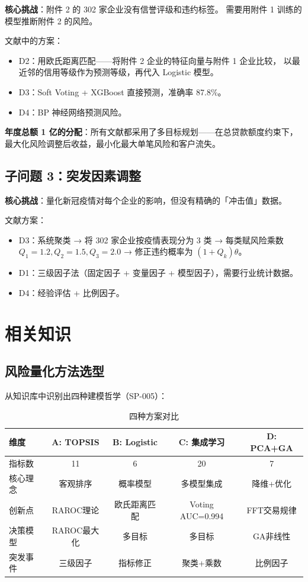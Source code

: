 \documentclass{internal-report}
\begin{document}
\textbf{核心挑战}：附件 2 的 302 家企业没有信誉评级和违约标签。
需要用附件 1 训练的模型推断附件 2 的风险。

文献中的方案：
\begin{itemize}
  \item D2：用欧氏距离匹配——将附件 2 企业的特征向量与附件 1 企业比较，
    以最近邻的信用等级作为预测等级，再代入 Logistic 模型。
  \item D3：Soft Voting + XGBoost 直接预测，准确率 87.8\%。
  \item D4：BP 神经网络预测风险。
\end{itemize}

\textbf{年度总额 1 亿的分配}：所有文献都采用了多目标规划——在总贷款额度约束下，
最大化风险调整后收益，最小化最大单笔风险和客户流失。

\subsection{子问题 3：突发因素调整}

\textbf{核心挑战}：量化新冠疫情对每个企业的影响，但没有精确的「冲击值」数据。

文献方案：
\begin{itemize}
  \item D3：系统聚类 → 将 302 家企业按疫情表现分为 3 类 → 每类赋风险乘数
    $Q_1=1.2, Q_2=1.5, Q_3=2.0$ → 修正违约概率为 $(1+Q_k)\theta$。
  \item D1：三级因子法（固定因子 + 变量因子 + 模型因子），需要行业统计数据。
  \item D4：经验评估 + 比例因子。
\end{itemize}

\section{相关知识}

\subsection{风险量化方法选型}

从知识库中识别出四种建模哲学（SP-005）：

\begin{table}[h]
\centering
\caption{四种方案对比}
\begin{tabular}{lcccc}
\toprule
维度 & A: TOPSIS & B: Logistic & C: 集成学习 & D: PCA+GA \\
\midrule
指标数 & 11 & 6 & 20 & 7 \\
核心理念 & 客观排序 & 概率模型 & 多模型集成 & 降维+优化 \\
创新点 & RAROC理论 & 欧氏距离匹配 & Voting AUC=0.994 & FFT交易规律 \\
决策模型 & RAROC最大化 & 多目标 & 多目标 & GA非线性 \\
突发事件 & 三级因子 & 指标修正 & 聚类+乘数 & 比例因子 \\
\bottomrule
\end{tabular}
\end{table}
\end{document}
